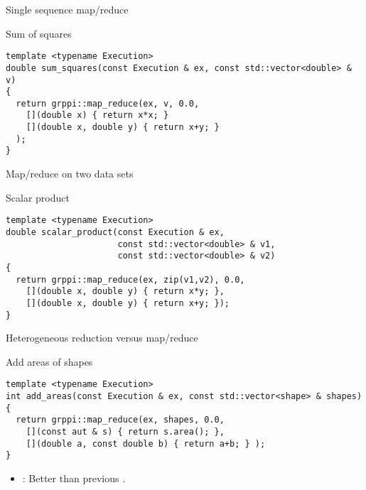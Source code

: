 \begin{frame}[t,fragile]{Single sequence map/reduce}
\begin{block}{Sum of squares}
\begin{lstlisting}
template <typename Execution>
double sum_squares(const Execution & ex, const std::vector<double> & v)
{
  return grppi::map_reduce(ex, v, 0.0,
    [](double x) { return x*x; }
    [](double x, double y) { return x+y; }
  );
}
\end{lstlisting}
\end{block}
\end{frame}

\begin{frame}[t,fragile]{Map/reduce on two data sets}
\begin{block}{Scalar product}
\begin{lstlisting}
template <typename Execution>
double scalar_product(const Execution & ex,
                      const std::vector<double> & v1,
                      const std::vector<double> & v2)
{
  return grppi::map_reduce(ex, zip(v1,v2), 0.0,
    [](double x, double y) { return x*y; },
    [](double x, double y) { return x+y; });
}
\end{lstlisting}
\end{block}
\end{frame}

\begin{frame}[t,fragile]{Heterogeneous reduction versus map/reduce}
\begin{block}{Add areas of shapes}
\begin{lstlisting}
template <typename Execution>
int add_areas(const Execution & ex, const std::vector<shape> & shapes)
{
  return grppi::map_reduce(ex, shapes, 0.0,
    [](const aut & s) { return s.area(); },
    [](double a, const double b) { return a+b; } );
}
\end{lstlisting}
\end{block}
\begin{itemize}
  \item {}: Better than previous .
\end{itemize}
\end{frame}



